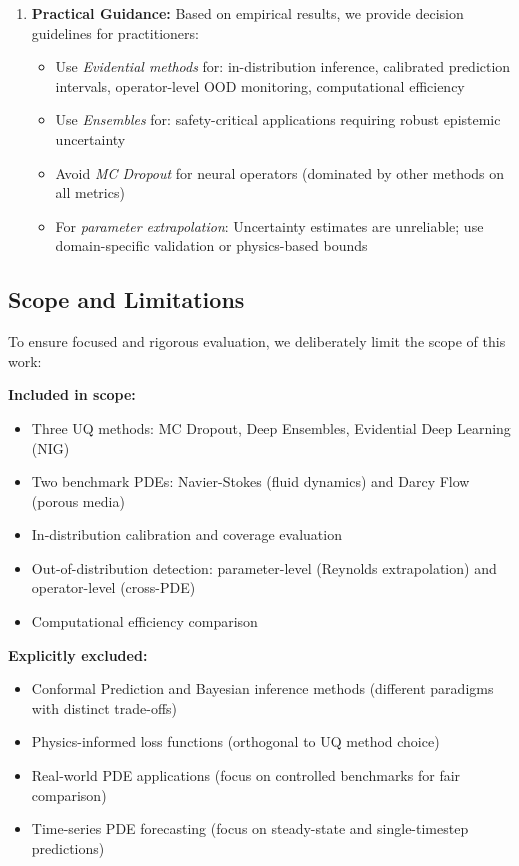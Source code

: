 \begin{enumerate}
    \item \textbf{Practical Guidance:} Based on empirical results, we provide decision guidelines for practitioners:
    \begin{itemize}
        \item Use \emph{Evidential methods} for: in-distribution inference, calibrated prediction intervals, operator-level OOD monitoring, computational efficiency
        \item Use \emph{Ensembles} for: safety-critical applications requiring robust epistemic uncertainty
        \item Avoid \emph{MC Dropout} for neural operators (dominated by other methods on all metrics)
        \item For \emph{parameter extrapolation}: Uncertainty estimates are unreliable; use domain-specific validation or physics-based bounds
    \end{itemize}
\end{enumerate}

\subsection{Scope and Limitations}

To ensure focused and rigorous evaluation, we deliberately limit the scope of this work:

\textbf{Included in scope:}
\begin{itemize}
    \item Three UQ methods: MC Dropout, Deep Ensembles, Evidential Deep Learning (NIG)
    \item Two benchmark PDEs: Navier-Stokes (fluid dynamics) and Darcy Flow (porous media)
    \item In-distribution calibration and coverage evaluation
    \item Out-of-distribution detection: parameter-level (Reynolds extrapolation) and operator-level (cross-PDE)
    \item Computational efficiency comparison
\end{itemize}

\textbf{Explicitly excluded:}
\begin{itemize}
    \item Conformal Prediction and Bayesian inference methods (different paradigms with distinct trade-offs)
    \item Physics-informed loss functions (orthogonal to UQ method choice)
    \item Real-world PDE applications (focus on controlled benchmarks for fair comparison)
    \item Time-series PDE forecasting (focus on steady-state and single-timestep predictions)
\end{itemize}

